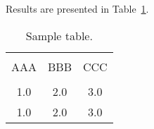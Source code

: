 \documentclass[jou,apacite]{apa6}
\begin{document}
\citet{medin}


Results are presented in Table~\ref{tab1}.

\begin{table}[!htb]
\caption{Sample table.}\label{tab1}
\begin{tabular}{ccc}
\hline\\[-1.5ex]
AAA & BBB & CCC \\[0.5ex]
\hline\\[-1.5ex]
1.0 & 2.0 & 3.0\\[0.5ex]
1.0 & 2.0 & 3.0\\[0.5ex]
\hline
\end{tabular}
\end{table}



\end{document}
